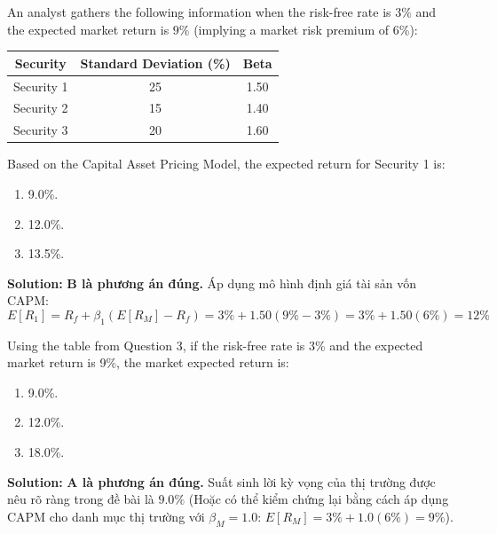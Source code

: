 \begin{tcolorbox}[
	colback=gray!5!white,
	colframe=black!15!white,
	boxrule=0.5pt,
	arc=3pt,
	title=\textbf{Question 3},
	coltitle=black,
	colbacktitle=black!5!white,
	before skip=6pt,
	after skip=6pt,
	breakable
]
An analyst gathers the following information when the risk-free rate is $3\%$ and the expected market return is $9\%$ (implying a market risk premium of 6\%):
\begin{center}
\begin{tabular}{c  c  c}
	\toprule
	\textbf{Security} & \textbf{Standard Deviation (\%)} & \textbf{Beta} \\
	\midrule
	Security 1 & 25 & 1.50 \\
	Security 2 & 15 & 1.40 \\
	Security 3 & 20 & 1.60 \\
	\bottomrule
\end{tabular}
\end{center}
Based on the Capital Asset Pricing Model, the expected return for Security 1 is:
\begin{enumerate}[label=\Alph*.]
	\item 9.0\%.
	\item 12.0\%.
	\item 13.5\%.
\end{enumerate}

\textbf{Solution:}
\textbf{B là phương án đúng.} Áp dụng mô hình định giá tài sản vốn CAPM:
\[
E[R_1] = R_f + \beta_1 (E[R_M] - R_f) = 3\% + 1.50(9\% - 3\%) = 3\% + 1.50(6\%) = 12\%
\]
\end{tcolorbox}

\begin{tcolorbox}[
	colback=gray!5!white,
	colframe=black!15!white,
	boxrule=0.5pt,
	arc=3pt,
	title=\textbf{Question 4},
	coltitle=black,
	colbacktitle=black!5!white,
	before skip=6pt,
	after skip=6pt,
	breakable
]
Using the table from Question 3, if the risk-free rate is 3\% and the expected market return is 9\%, the market expected return is:
\begin{enumerate}[label=\Alph*.]
	\item 9.0\%.
	\item 12.0\%.
	\item 18.0\%.
\end{enumerate}

\textbf{Solution:}
\textbf{A là phương án đúng.} Suất sinh lời kỳ vọng của thị trường được nêu rõ ràng trong đề bài là $9.0\%$ (Hoặc có thể kiểm chứng lại bằng cách áp dụng CAPM cho danh mục thị trường với $\beta_M = 1.0$: $E[R_M] = 3\% + 1.0(6\%) = 9\%$).
\end{tcolorbox}

